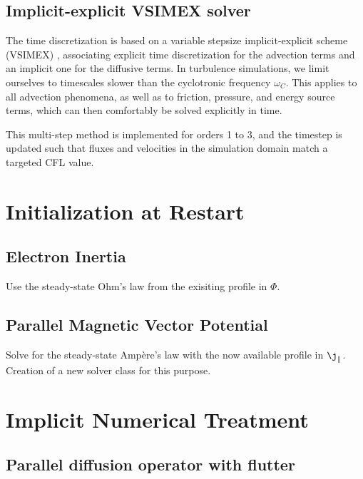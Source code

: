 
\subsection{Implicit-explicit VSIMEX solver}

The time discretization is based on a variable stepsize implicit-explicit scheme (VSIMEX) \cite{wang2008variable}, associating explicit time discretization for the advection terms and an implicit one for the diffusive terms. In turbulence simulations, we limit ourselves to timescales slower than the cyclotronic frequency $\omega_C$. This applies to all advection phenomena, as well as to friction, pressure, and energy source terms, which can then comfortably be solved explicitly in time. \newline


This multi-step method is implemented for orders 1 to 3, and the timestep is updated such that fluxes and velocities in the simulation domain match a targeted CFL value. \newline



\section{Initialization at Restart}
\subsection{Electron Inertia}
Use the steady-state Ohm's law from the exisiting profile in $\Phi$.

\subsection{Parallel Magnetic Vector Potential}
Solve for the steady-state Ampère's law with the now available profile in $\j_\parallel$. Creation of a new solver class for this purpose.

\section{Implicit Numerical Treatment}

\subsection{Parallel diffusion operator with flutter}
\label{ssec:3DGunter}

